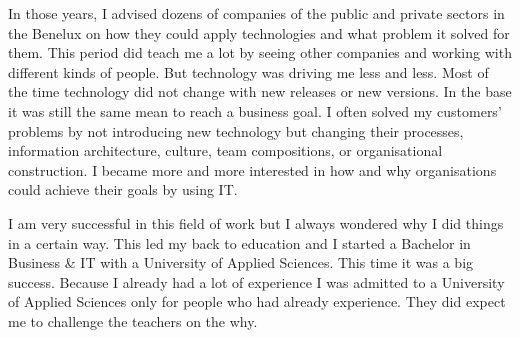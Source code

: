In those years, I advised dozens of companies of the public and private sectors in the Benelux on how they could apply technologies and what problem it solved for them. This period did teach me a lot by seeing other companies and working with different kinds of people. But technology was driving me less and less. Most of the time technology did not change with new releases or new versions. In the base it was still the same mean to reach a business goal. I often solved my customers' problems by not introducing new technology but changing their processes, information architecture, culture, team compositions, or organisational construction. I became more and more interested in how and why organisations could achieve their goals by using IT.

I am very successful in this field of work but I always wondered why I did things in a certain way. This led my back to education and I started a Bachelor in Business \& IT with a University of Applied Sciences. This time it was a big success. Because I already had a lot of experience I was admitted to a University of Applied Sciences only for people who had already experience. They did expect me to challenge the teachers on the why.


